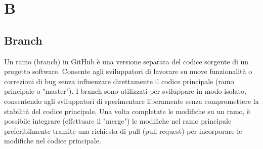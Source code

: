 \section{B}
\subsection{Branch}
Un ramo (branch) in GitHub è una versione separata del codice sorgente di un
progetto software. Consente agli sviluppatori di lavorare su nuove funzionalità
o correzioni di bug senza influenzare direttamente il codice principale (ramo
principale o "master"). I branch sono utilizzati per sviluppare in modo
isolato, consentendo agli sviluppatori di sperimentare liberamente senza
compromettere la stabilità del codice principale. Una volta completate le
modifiche su un ramo, è possibile integrare (effettuare il "merge") le
modifiche nel ramo principale preferibilmente tramite una richiesta di pull
(pull request) per incorporare le modifiche nel codice principale.
